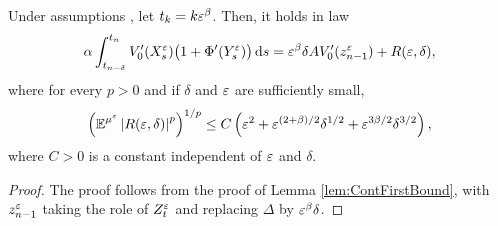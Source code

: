\documentclass[10pt]{article}
\begin{document}
\begin{lemma}\label{lem:DiscFirstBound} Under assumptions , let $t_k = k\varepsilon^\beta$. Then, it holds in law
	\begin{equation}
		\alpha\int_{t_{n-\delta}}^{t_n} V_0'(X^\varepsilon_s)\big(1 + \Phi'(Y^\varepsilon_s)\big)\,\mathrm{d} s = \varepsilon^\beta \delta A V_0'(z^\varepsilon_{n-1}) + R(\varepsilon, \delta),
	\end{equation}
	where for every $p > 0$ and if $\delta$ and $\varepsilon$ are sufficiently small,
	\begin{equation}
		\left(\operatorname{\mathbb{E}}^{\mu^\varepsilon}\left\lvert R(\varepsilon, \delta)\right\rvert^p\right)^{1/p}\leq C\left(\varepsilon^2 + \varepsilon^{(2+\beta)/2}\delta^{1/2} + \varepsilon^{3\beta/2} \delta^{3/2} \right),
	\end{equation}
	where $C > 0$ is a constant independent of $\varepsilon$ and $\delta$.
\end{lemma}
\begin{proof} The proof follows from the proof of Lemma \ref{lem:ContFirstBound}, with $z_{n-1}^\varepsilon$ taking the role of $Z_t^\varepsilon$ and replacing $\Delta$ by $\varepsilon^\beta\delta$.
\end{proof}
\end{document}
